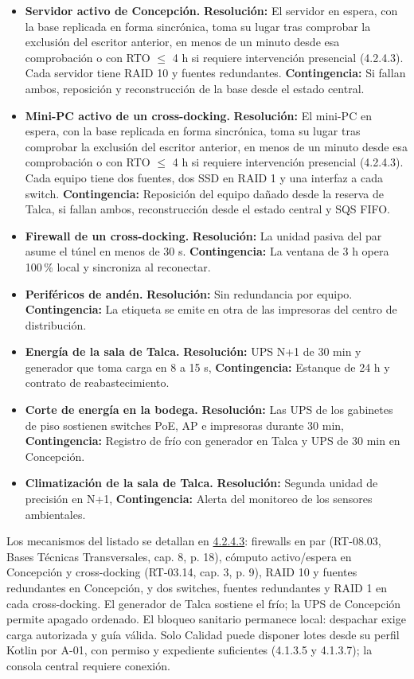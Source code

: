 \begin{itemize}
\item \textbf{Servidor activo de Concepción.} \textbf{Resolución:} El servidor en espera, con la base replicada en forma sincrónica, toma su lugar tras comprobar la exclusión del escritor anterior, en menos de un minuto desde esa comprobación o con RTO $\leq$ 4 h si requiere intervención presencial (4.2.4.3). Cada servidor tiene RAID 10 y fuentes redundantes. \textbf{Contingencia:} Si fallan ambos, reposición y reconstrucción de la base desde el estado central.
\item \textbf{Mini-PC activo de un cross-docking.} \textbf{Resolución:} El mini-PC en espera, con la base replicada en forma sincrónica, toma su lugar tras comprobar la exclusión del escritor anterior, en menos de un minuto desde esa comprobación o con RTO $\leq$ 4 h si requiere intervención presencial (4.2.4.3). Cada equipo tiene dos fuentes, dos SSD en RAID 1 y una interfaz a cada switch. \textbf{Contingencia:} Reposición del equipo dañado desde la reserva de Talca, si fallan ambos, reconstrucción desde el estado central y SQS FIFO.
\item \textbf{Firewall de un cross-docking.} \textbf{Resolución:} La unidad pasiva del par asume el túnel en menos de 30 s. \textbf{Contingencia:} La ventana de 3 h opera 100\,\% local y sincroniza al reconectar.
\item \textbf{Periféricos de andén.} \textbf{Resolución:} Sin redundancia por equipo. \textbf{Contingencia:} La etiqueta se emite en otra de las impresoras del centro de distribución.
\item \textbf{Energía de la sala de Talca.} \textbf{Resolución:} UPS N+1 de 30 min y generador que toma carga en 8 a 15 s, \textbf{Contingencia:} Estanque de 24 h y contrato de reabastecimiento.
\item \textbf{Corte de energía en la bodega.} \textbf{Resolución:} Las UPS de los gabinetes de piso sostienen switches PoE, AP e impresoras durante 30 min, \textbf{Contingencia:} Registro de frío con generador en Talca y UPS de 30 min en Concepción.
\item \textbf{Climatización de la sala de Talca.} \textbf{Resolución:} Segunda unidad de precisión en N+1, \textbf{Contingencia:} Alerta del monitoreo de los sensores ambientales.
\end{itemize}

Los mecanismos del listado se detallan en \hyperref[sub:3-alta-disponibilidad]{4.2.4.3}: firewalls en par (RT-08.03, Bases Técnicas Transversales, cap. 8, p. 18), cómputo activo/espera en Concepción y cross-docking (RT-03.14, cap. 3, p. 9), RAID 10 y fuentes redundantes en Concepción, y dos switches, fuentes redundantes y RAID 1 en cada cross-docking. El generador de Talca sostiene el frío; la UPS de Concepción permite apagado ordenado. El bloqueo sanitario permanece local: despachar exige carga autorizada y guía válida. Solo Calidad puede disponer lotes desde su perfil Kotlin por A-01, con permiso y expediente suficientes (4.1.3.5 y 4.1.3.7); la consola central requiere conexión.

